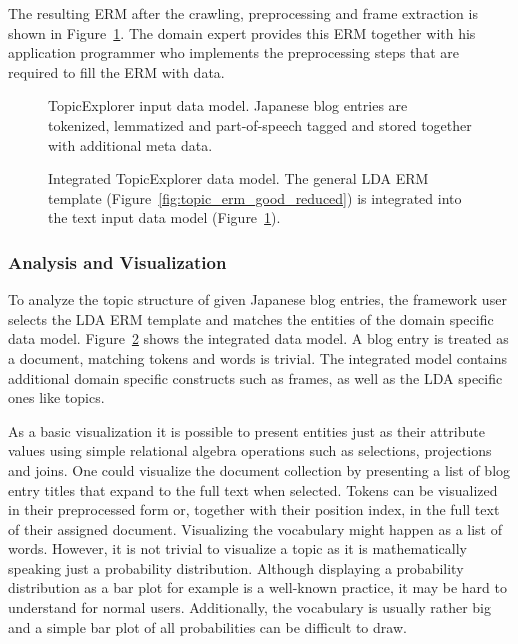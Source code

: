 The resulting ERM after the crawling, preprocessing and frame extraction is shown in Figure~\ref{fig:TopicExplorer_data_erm}. The domain expert provides this ERM together with his application programmer who implements the preprocessing steps that are required to fill the ERM with data.

\begin{figure}[p]
\centering
\scalebox{\tikzScale}{\adjustTikzSize }
\caption[TopicExplorer input data model]{TopicExplorer input data model. Japanese blog entries are tokenized, lemmatized and part-of-speech tagged and stored together with additional meta data.}\label{fig:TopicExplorer_data_erm}
\end{figure}

\begin{figure}[p]
\centering
\scalebox{0.7}{\adjustTikzSize }
\caption[Integrated TopicExplorer data model]{Integrated TopicExplorer data model. The general LDA ERM template (Figure~\ref{fig:topic_erm_good_reduced}) is integrated into the text input data model (Figure~\ref{fig:TopicExplorer_data_erm}).}\label{fig:TopicExplorer_integrated_erm}
\end{figure}

\subsubsection{Analysis and Visualization}
\label{subsec:casestudy_analysis}

To analyze the topic structure of given Japanese blog entries, the framework user selects the LDA ERM template and matches the entities of the domain specific data model. Figure~\ref{fig:TopicExplorer_integrated_erm} shows the integrated data model. A blog entry is treated as a document, matching tokens and words is trivial. The integrated model contains additional domain specific constructs such as frames, as well as the LDA specific ones like topics.

As a basic visualization it is possible to present entities just as their attribute values using simple relational algebra operations such as selections, projections and joins. One could visualize the document collection by presenting a list of blog entry titles that expand to the full text when selected. Tokens can be visualized in their preprocessed form or, together with their position index, in the full text of their assigned document. Visualizing the vocabulary might happen as a list of words. However, it is not trivial to visualize a topic as it is mathematically speaking just a probability distribution. Although displaying a probability distribution as a bar plot for example is a well-known practice, it may be hard to understand for normal users. Additionally, the vocabulary is usually rather big and a simple bar plot of all probabilities can be difficult to draw.

